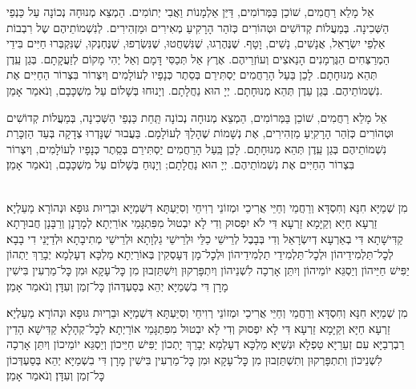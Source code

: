 \documentclass[twoside, openany, parskip=half, 11pt]{book}
\begin{document}
אֵל מָלֵא רַחֲמִים, שׁוֹכֵן בַּמְּרוֹמִים, דַּיַּן אַלְמָנוֹת וַאֲבִי יְתוֹמִים. הַמְצֵא מְנוּחָה נְכוֹנָה עַל כַּנְפֵי הַשְּׁכִינָה. בְּמַעֲלוֹת קְדוֹשִׁים וּטְהוֹרִים כְּזֹהַר הָרָקִיעַ מְאִירִים וּמַזְהִירִים. לְנִשְׁמוֹתֵיהֶם שֶל רִבְבוֹת אַלְפֵי יִשְׂרָאֵל, אֲנָשִׁים, נָשִׁים, וָטָף. שֶׁנֶּהֶרְגוּ, שֶׁנִּשְׁחֲטוּ, שֶׁנִּשְׂרְפוּ, שֶׁנֶּחְנְקוּ, שֶׁנִּקְבְּרוּ חַיִּים  בִּידֵי הַמְרַצְּחִים הַגֶּרְמָנִים הָנַאצִים וְעוֹזְרֵיהֶם. אֶרֶץ אַל תְּכַסִּי דָּמָם וְאַל יְהִי מָקוֹם לְזַעֲקָתָם. בְּגַן עֵֽדֶן תְּהֵא מְנוּחָתָם. לָכֵן בַּעַל הָרַחֲמִים יַסְתִּירֵם בְּסֵתֶר כְּנָפָיו לְעוֹלָמִים וְיִצְרוֹר בִּצְרוֹר הַחַיִּים אֶת נִשְׁמוֹתֵיהֶם. בְּגַן עֵדֶן תְּהֵא מְנוּחָתָם. יְיָ הוּא נַחֲלָתָם. וְיָנוּחוּ בְּשָׁלוֹם עַל מִשְׁכָּבָם, וְנֹאמַר אָמֵן.


אֵל מָלֵא רַחֲמִים, שׁוֹכֵן בַּמְּרוֹמִים, הַמְצֵא מְנוּחָה נְכוֹנָה תַּֽחַת כַּנְפֵי הַשְּׁכִינָה, בְּמַעֲלוֹת קְדוֹשִׁים וּטְהוֹרִים כְּזֹֽהַר הָרָקִֽיעַ מַזְהִירִים, אֶת נְשָׁמוֹת  שֶׁהָלַךְ לְעוֹלָמָם. בַּעֲבוּר שֶׁנָּדְרוּ צְדָקָה בְּעַד הַזְכָּרַת נִשְׁמוֹתֵיהֶם בְּגַן עֵֽדֶן תְּהֵא מְנוּחָתָם. לָכֵן בַּֽעַל הָרַחֲמִים יַסְתִּירֵם בְּסֵֽתֶר כְּנָפָיו לְעוֹלָמִים, וְיִצְרוֹר בִּצְרוֹר הַחַיִּים אֶת נִשְׁמוֹתֵיהֶם. יְיָ הוּא נַחֲלָתָם; וְיָנֽוּחַ בְּשָׁלוֹם עַל מִשְׁכָּבָם, וְנֹאמַר אָמֵן׃



\shabbos\\
מִן שְׁמַיָּא חִנָּא וְחִסְדָּא וְרַחֲמֵי וְחַיֵּי אֲרִיכֵי וּמְזוֹנֵי רְוִיחֵי וְסִיַּעְתָּא דִשְּׁמַיָּא וּבַרְיוּת גּוּפָא וּנְהוֹרָא מַעַלְיָא׃ זַרְעָא חַיָּא וְקַיָּמָא זַרְעָא דִּי לֹא יִפְסוּק וְדִי לָא יִבְטוּל מִפִּתְגָּמֵי אוֹרַיְתָא׃ לְמָרָנָן וְרַבָּנָן חֲבוּרָתָא קַדִּישָׁתָא דִּי בְאַרְעָא דְיִשְׂרָאֵל וְדִי בְּבָבֶל לְרֵישֵׁי כַלֵּי וּלְרֵישֵׁי גַלְוָתָא וּלְרֵישֵׁי מְתִיבָתָא וּלְדַיָּנֵי דִי בָבָא׃ לְכׇל־תַּלְמִידֵיהוֹן וּלְכׇל־תַּלְמִידֵי תַלְמִידֵיהוֹן וּלְכׇל־מָן דְּעָסְקִין בְּאוֹרַיְתָא׃ מַלְכָּא דְעָלְמָא יְבָרֵךְ יַתְהוֹן יַפִּישׁ חַיֵּיהוֹן וְיַסְגֵּא יוֹמֵיהוֹן וְיִתֵּן אָרְכָה לִשְׁנֵיהוֹן וְיִתְפָּרְקוּן וְיִשְׁתֵּזְבוּן מִן כׇּל־עָקָא וּמִן כׇּל־מַרְעִין בִּישִׁין מָרָן דִּי בִשְׁמַיָּא יְהֵא בְּסַעְדְּהוֹן כׇּל־זְמַן וְעִדָּן׃ וְנֹאמַר אָמֵן׃



מִן שְׁמַיָּא חִנָּא וְחִסְדָּא וְרַחֲמֵי וְחַיֵּי אֲרִיכֵי וּמְזוֹנֵי רְוִיחֵי וְסִיַּעְתָּא דִּשְׁמַיָּא וּבַרְיוּת גּוּפָא וּנְהוֹרָא מַעַלְיָא׃ זַרְעָא חַיָּא וְקַיָּמָא זַרְעָא דִּי לָא יִפְסוּק וְדִי לָא יִבְטוּל מִפִּתְגָּמֵי אוֹרַיְתָא׃ לְכׇל־קְהָלָא קַדִּישָׁא הָדֵין רַבְרְבַיָּא עִם זְעֵרַיָּא טַפְלָא וּנְשַׁיָּא׃ מַלְכָּא דְעָלְמָא יְבָרֵךְ יָתְכוֹן יַפִּישׁ חַיֵּיכוֹן וְיַסְגֵּא יוֹמֵיכוֹן וְיִתֵּן אָרְכָה לִשְׁנֵיכוֹן וְתִתְפָּרְקוּן וְתִשְׁתֵּזְבוּן מִן כׇּל־עָקָא וּמִן כׇּל־מַרְעִין בִּישִׁין מָרָן דִּי בִשְׁמַיָּא יְהֵא בְּסַעְדְּכוֹן כׇּל־זְמַן וְעִדָּן׃ וְנֹאמַר אָמֵן׃
\end{document}
